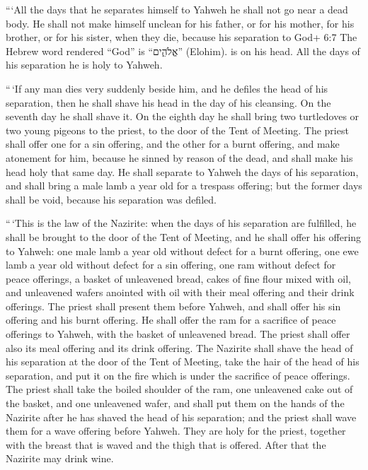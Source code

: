  ```All the days that he separates himself to Yahweh he
shall not go near a dead body.  He shall not make himself
unclean for his father, or for his mother, for his brother, or for his
sister, when they die, because his separation to God+ 6:7 The Hebrew
word rendered ``God'' is ``אֱלֹהִ֑ים'' (Elohim). is on his head.
 All the days of his separation he is holy to Yahweh.

 ``\,`If any man dies very suddenly beside him, and he
defiles the head of his separation, then he shall shave his head in the
day of his cleansing. On the seventh day he shall shave it.
 On the eighth day he shall bring two turtledoves or two
young pigeons to the priest, to the door of the Tent of Meeting.
 The priest shall offer one for a sin offering, and the
other for a burnt offering, and make atonement for him, because he
sinned by reason of the dead, and shall make his head holy that same
day.  He shall separate to Yahweh the days of his
separation, and shall bring a male lamb a year old for a trespass
offering; but the former days shall be void, because his separation was
defiled.

 ``\,`This is the law of the Nazirite: when the days of his
separation are fulfilled, he shall be brought to the door of the Tent of
Meeting,  and he shall offer his offering to Yahweh: one
male lamb a year old without defect for a burnt offering, one ewe lamb a
year old without defect for a sin offering, one ram without defect for
peace offerings,  a basket of unleavened bread, cakes of
fine flour mixed with oil, and unleavened wafers anointed with oil with
their meal offering and their drink offerings.  The priest
shall present them before Yahweh, and shall offer his sin offering and
his burnt offering.  He shall offer the ram for a sacrifice
of peace offerings to Yahweh, with the basket of unleavened bread. The
priest shall offer also its meal offering and its drink offering.
 The Nazirite shall shave the head of his separation at the
door of the Tent of Meeting, take the hair of the head of his
separation, and put it on the fire which is under the sacrifice of peace
offerings.  The priest shall take the boiled shoulder of
the ram, one unleavened cake out of the basket, and one unleavened
wafer, and shall put them on the hands of the Nazirite after he has
shaved the head of his separation;  and the priest shall
wave them for a wave offering before Yahweh. They are holy for the
priest, together with the breast that is waved and the thigh that is
offered. After that the Nazirite may drink wine.

